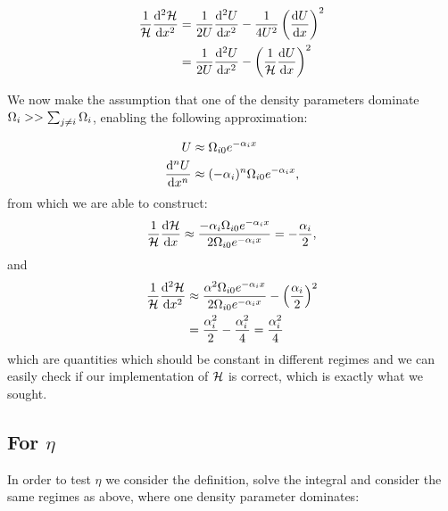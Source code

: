     \begin{equation}
        \begin{split}
            \frac{1}{\mathcal{H}}\dv[2]{\mathcal{H}}{x} &= \frac{1}{2U}\dv[2]{U}{x} - \frac{1}{4U^2}\left(\dv{U}{x}\right)^2 \\
            &= \frac{1}{2U}\dv[2]{U}{x}-\left(\frac{1}{\mathcal{H}}\dv{U}{x}\right)^2
        \end{split}
    \end{equation}

    We now make the assumption that one of the density parameters dominate $\Omega_i>> \sum_{j\neq i}\Omega_i$, enabling the following approximation:
    
    \begin{equation}
        \begin{split}
            U &\approx \Omega_{i0}e^{-\alpha_ix} \\
            \dv[n]{U}{x} &\approx (-\alpha_i)^n\Omega_{i0}e^{-\alpha_ix},
        \end{split}
    \end{equation}
    from which we are able to construct:
    \begin{equation}
        \frac{1}{\mathcal{H}}\dv{\mathcal{H}}{x} \approx \frac{-\alpha_i\Omega_{i0}e^{-\alpha_ix}}{2\Omega_{i0}e^{-\alpha_ix}} = -\frac{\alpha_i}{2},
    \end{equation}
    and
    \begin{equation}
        \begin{split}
            \frac{1}{\mathcal{H}}\dv[2]{\mathcal{H}}{x} &\approx \frac{\alpha^2\Omega_{i0}e^{-\alpha_ix}}{2\Omega_{i0}e^{-\alpha_ix}} - \left(\frac{\alpha_i}{2}\right)^2 \\
            &= \frac{\alpha_i^2}{2} - \frac{\alpha_i^2}{4} = \frac{\alpha_i^2}{4}
        \end{split}
    \end{equation}
    which are quantities which should be constant in different regimes and we can easily check if our implementation of $\mathcal{H}$ is correct, which is exactly what we sought. 

\subsection{For $\eta$}

    In order to test $\eta$ we consider the definition, solve the integral and consider the same regimes as above, where one density parameter dominates:

